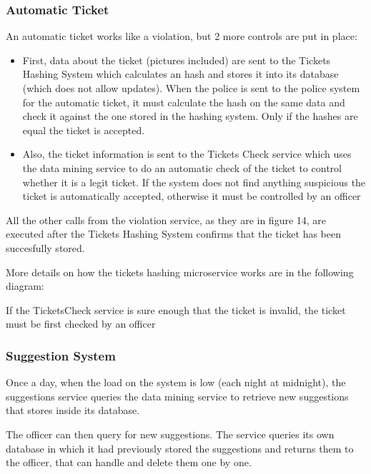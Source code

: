 \subsubsection{Automatic Ticket}
An automatic ticket works like a violation, but 2 more controls are put in place:
\begin{itemize}
    \item First, data about the ticket (pictures included) are sent to the Tickets Hashing System which calculates an hash and stores it into its database (which does not allow updates). When the police is sent to the police system for the automatic ticket, it must calculate the hash on the same data and check it against the one stored in the hashing system. Only if the hashes are equal the ticket is accepted.
    \item Also, the ticket information is sent to the Tickets Check service which uses the data mining service to do an automatic check of the ticket to control whether it is a legit ticket. If the system does not find anything suspicious the ticket is automatically accepted, otherwise it must be controlled by an officer
\end{itemize}
All the other calls from the violation service, as they are in figure 14, are executed after the Tickets Hashing System confirms that the ticket has been succesfully stored.


More details on how the tickets hashing microservice works are in the following diagram:


If the TicketsCheck service is sure enough that the ticket is invalid, the ticket must be first checked by an officer


\subsubsection{Suggestion System}
Once a day, when the load on the system is low (each night at midnight), the suggestions service queries the data mining service to retrieve new suggestions that stores inside its database.

The officer can then query for new suggestions. The service queries its own database in which it had previously stored the suggestions and returns them to the officer, that can handle and delete them one by one.
